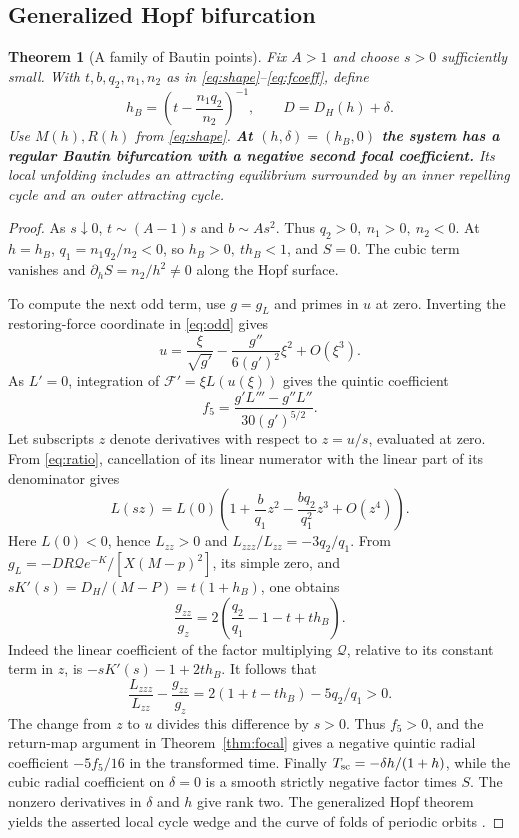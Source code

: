 \documentclass[12pt,a4paper,twoside,fleqn]{article}
\theoremstyle{journal}
\newtheorem{theorem}{Theorem}
\newcommand{\claim}[1]{{\normalfont\bfseries\boldmath #1}}
\newcommand{\Q}{\mathcal Q}
\begin{document}
\subsection{Generalized Hopf bifurcation}
\begin{theorem}[A family of Bautin points]\label{thm:bautin}
Fix \(A>1\) and choose \(s>0\) sufficiently small. With \(t,b,q_2,n_1,n_2\) as in \eqref{eq:shape}--\eqref{eq:fcoeff}, define
\[
 h_B=\left(t-\frac{n_1q_2}{n_2}\right)^{-1},\qquad
 D=D_H(h)+\delta .
\]
Use \(M(h),R(h)\) from \eqref{eq:shape}.
\claim{At \((h,\delta)=(h_B,0)\) the system has a regular Bautin bifurcation with a negative second focal coefficient.} Its local unfolding includes an attracting equilibrium surrounded by an inner repelling cycle and an outer attracting cycle.
\end{theorem}
\begin{proof}
As \(s\downarrow0\), \(t\sim(A-1)s\) and \(b\sim As^2\). Thus \(q_2>0,\ n_1>0,\ n_2<0\). At \(h=h_B\), \(q_1=n_1q_2/n_2<0\), so \(h_B>0,\ th_B<1\), and \(S=0\). The cubic term vanishes and \(\partial_h S=n_2/h^2\ne0\) along the Hopf surface.

To compute the next odd term, use \(g=g_L\) and primes in \(u\) at zero. Inverting the restoring-force coordinate in \eqref{eq:odd} gives
\[
 u=\frac{\xi}{\sqrt{g'}}-\frac{g''}{6(g')^2}\xi^2+O(\xi^3).
\]
As \(L'=0\), integration of \(\mathcal F'=\xi L(u(\xi))\) gives the quintic coefficient
\[
 f_5=\frac{g'L'''-g''L''}{30(g')^{5/2}} .
\]
Let subscripts \(z\) denote derivatives with respect to \(z=u/s\), evaluated at zero. From \eqref{eq:ratio}, cancellation of its linear numerator with the linear part of its denominator gives
\[
 L(sz)=L(0)\left(1+\frac b{q_1}z^2-\frac{bq_2}{q_1^2}z^3+O(z^4)\right).
\]
Here \(L(0)<0\), hence \(L_{zz}>0\) and \(L_{zzz}/L_{zz}=-3q_2/q_1\). From \(g_L=-DR\Q e^{-K}/[X(M-p)^2]\), its simple zero, and \(sK'(s)=D_H/(M-P)=t(1+h_B)\), one obtains
\[
 \frac{g_{zz}}{g_z}
 =2\left(\frac{q_2}{q_1}-1-t+t h_B\right).
\]
Indeed the linear coefficient of the factor multiplying \(\Q\), relative to its constant term in \(z\), is \(-sK'(s)-1+2th_B\). It follows that
\[
 \frac{L_{zzz}}{L_{zz}}-\frac{g_{zz}}{g_z}
 =2(1+t-th_B)-5q_2/q_1>0 .
\]
The change from \(z\) to \(u\) divides this difference by \(s>0\). Thus \(f_5>0\), and the return-map argument in Theorem~\ref{thm:focal} gives a negative quintic radial coefficient \(-5f_5/16\) in the transformed time. Finally \(T_{\rm sc}=-\delta h/(1+h)\), while the cubic radial coefficient on \(\delta=0\) is a smooth strictly negative factor times \(S\). The nonzero derivatives in \(\delta\) and \(h\) give rank two. The generalized Hopf theorem yields the asserted local cycle wedge and the curve of folds of periodic orbits \citep{kuznetsov98}.
\end{proof}
\end{document}
